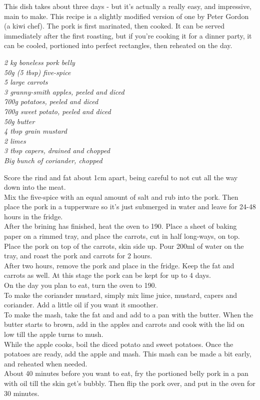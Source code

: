 \documentclass{tufte-book}
\begin{document}
This dish takes about three days - but it's actually a really easy, and impressive, main to make. This recipe is a slightly modified version of one by Peter Gordon (a kiwi chef). The pork is first marinated, then cooked. It can be served immediately after the first roasting, but if you're cooking it for a dinner party, it can be cooled, portioned into perfect rectangles, then reheated on the day.

\smallskip
\emph{2 kg boneless pork belly
\\50g (5 tbsp) five-spice
\\5 large carrots
\\3 granny-smith apples, peeled and diced
\\700g potatoes, peeled and diced
\\700g sweet potato, peeled and diced
\\50g butter
\\4 tbsp grain mustard
\\2 limes
\\3 tbsp capers, drained and chopped
\\Big bunch of coriander, chopped
}

\smallskip
Score the rind and fat about 1cm apart, being careful to not cut all the way down into the meat. 
\\Mix the five-spice with an equal amount of salt and rub into the pork. Then place the pork in a tupperware so it's just submerged in water and leave for 24-48 hours in the fridge.
\\After the brining has finished, heat the oven to 190\celsius. Place a sheet of baking paper on a rimmed tray, and place the carrots, cut in half long-ways, on top. 
\\Place the pork on top of the carrots, skin side up. Pour 200ml of water on the tray, and roast the pork and carrots for 2 hours. 
\\After two hours, remove the pork and place in the fridge. Keep the fat and carrots as well. At this stage the pork can be kept for up to 4 days.
\\On the day you plan to eat, turn the oven to 190\celsius. 
\\To make the coriander mustard, simply mix lime juice, mustard, capers and coriander. Add a little oil if you want it smoother. 
\\To make the mash, take the fat and and add to a pan with the butter. When the butter starts to brown, add in the apples and carrots and cook with the lid on low till the apple turns to mush. 
\\While the apple cooks, boil the diced potato and sweet potatoes. Once the potatoes are ready, add the apple and mash. This mash can be made a bit early, and reheated when needed. 
\\About 40 minutes before you want to eat, fry the portioned belly pork in a pan with oil till the skin get's bubbly. Then flip the pork over, and put in the oven for 30 minutes.
\end{document}
